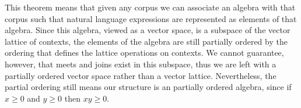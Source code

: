 \documentclass[12pt]{report}
\begin{document}
This theorem means that given any corpus we can associate an algebra with that corpus such that natural language expressions are represented as elements of that algebra. %
Since this algebra, viewed as a vector space, is a subspace of the vector lattice of contexts, the elements of the algebra are still partially ordered by the ordering that defines the lattice operations on contexts. We cannot guarantee, however, that meets and joins exist in this subspace, thus we are left with a partially ordered vector space rather than a vector lattice. Nevertheless, the partial ordering still means our structure is an partially ordered algebra, since if $x \ge 0$ and $y \ge 0$ then $xy \ge 0$.



\end{document}
